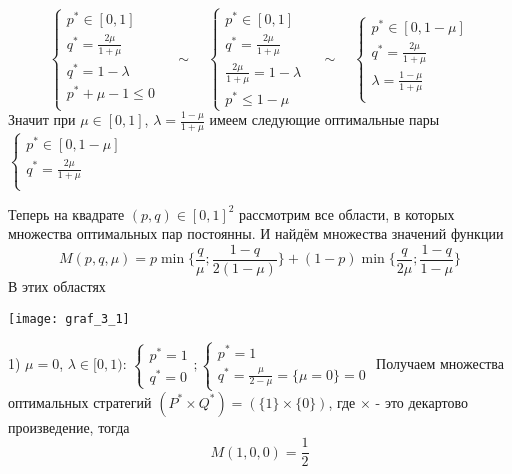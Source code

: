 \[
\begin{cases}
p^{*} \in [0, 1] \\
q^{*}=\frac{2\mu}{1+\mu} \\
q^{*}=1-\lambda \\
p^{*}+\mu-1 \leq 0 \\
\end{cases}
\quad\sim\quad
\begin{cases}
p^{*} \in [0, 1] \\
q^{*}=\frac{2\mu}{1+\mu} \\
\frac{2\mu}{1+\mu}=1-\lambda \\
p^{*} \leq 1 - \mu 
\end{cases}
\quad\sim\quad
\begin{cases}
p^{*} \in [0, 1-\mu] \\
q^{*}=\frac{2\mu}{1+\mu} \\
\lambda = \frac{1-\mu}{1+\mu} \\
\end{cases}
\]
Значит при $\mu \in [0, 1]$, $\lambda = \frac{1-\mu}{1+\mu} $ имеем следующие оптимальные пары
$\begin{cases}
p^{*} \in [0, 1-\mu] \\
q^{*}=\frac{2\mu}{1+\mu} \\
\end{cases}$
\vspace{10mm}

Теперь на квадрате $(p,q)\in[0, 1]^{2}$ рассмотрим все области, в которых множества оптимальных пар постоянны. И найдём множества значений функции 
\[
M(p,q,\mu)=p\min{\{\frac{q}{\mu};\frac{1-q}{2(1-\mu)}\}}+(1-p)\min\{\frac{q}{2\mu};\frac{1-q}{1-\mu}\}
\]
В этих областях

\begin{center}
\texttt{[image: graf\_3\_1]}
\end{center}

1) $\mu=0$, $\lambda \in [0, 1)$: 
$\begin{cases}p^{*}=1 \\ q^{*}=0 \end{cases};
\begin{cases}p^{*}=1 \\ q^{*}=\frac{\mu}{2-\mu} 
= \{\mu=0\}=0 \end{cases} $ \hfill \break
Получаем множества оптимальных стратегий 
$(P^{*} \times Q^{*}) =(\{1\} \times \{0\})$, где $\times$ - это декартово произведение, тогда
$$M(1,0,0)=\frac{1}{2}$$


